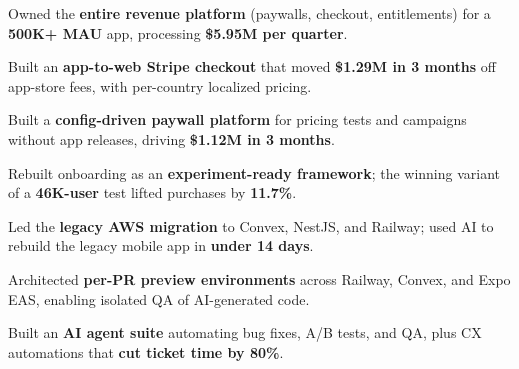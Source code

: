 \documentclass[10pt,a4paper]{resume}
\begin{document}


\begin{highlights}
    \item Owned the \textbf{entire revenue platform} (paywalls, checkout, entitlements) for a \textbf{500K+ MAU} app, processing \textbf{\$5.95M per quarter}.
    \item Built an \textbf{app-to-web Stripe checkout} that moved \textbf{\$1.29M in 3 months} off app-store fees, with per-country localized pricing.
    \item Built a \textbf{config-driven paywall platform} for pricing tests and campaigns without app releases, driving \textbf{\$1.12M in 3 months}.
    \item Rebuilt onboarding as an \textbf{experiment-ready framework}; the winning variant of a \textbf{46K-user} test lifted purchases by \textbf{11.7\%}.
    \item Led the \textbf{legacy AWS migration} to Convex, NestJS, and Railway; used AI to rebuild the legacy mobile app in \textbf{under 14 days}.
    \item Architected \textbf{per-PR preview environments} across Railway, Convex, and Expo EAS, enabling isolated QA of AI-generated code.
    \item Built an \textbf{AI agent suite} automating bug fixes, A/B tests, and QA, plus CX automations that \textbf{cut ticket time by 80\%}.
\end{highlights}
\divider
\end{document}

